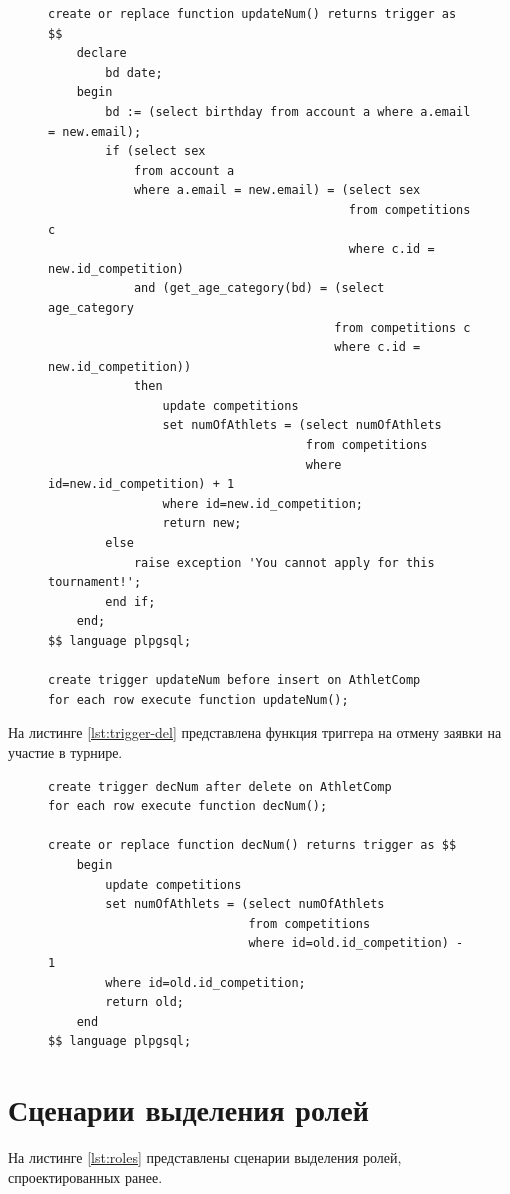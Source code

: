 \begin{figure}[H]
\begin{lstlisting}[label=lst:trigger-insert,caption=Реализация триггера BEFORE на добавление заявки ]
create or replace function updateNum() returns trigger as $$
	declare 
		bd date;
	begin
		bd := (select birthday from account a where a.email = new.email);
		if (select sex 
			from account a 
			where a.email = new.email) = (select sex 
										  from competitions c 
										  where c.id = new.id_competition) 
			and (get_age_category(bd) = (select age_category 
										from competitions c 
										where c.id = new.id_competition)) 
			then 
				update competitions
				set numOfAthlets = (select numOfAthlets 
									from competitions 
									where id=new.id_competition) + 1
				where id=new.id_competition;
				return new;
		else
			raise exception 'You cannot apply for this tournament!';
		end if;
	end;
$$ language plpgsql;

create trigger updateNum before insert on AthletComp
for each row execute function updateNum();
\end{lstlisting}
\end{figure}

На листинге \ref{lst:trigger-del} представлена функция триггера на отмену заявки на участие в турнире.

\begin{figure}[H]
	\begin{lstlisting}[label=lst:trigger-del,caption=Реализация триггера AFTER на удаление заявки ]
create trigger decNum after delete on AthletComp
for each row execute function decNum();

create or replace function decNum() returns trigger as $$
	begin
		update competitions
		set numOfAthlets = (select numOfAthlets 
							from competitions 
							where id=old.id_competition) - 1
		where id=old.id_competition;
		return old;
	end
$$ language plpgsql;
	\end{lstlisting}
\end{figure}

\section{Сценарии выделения ролей}

На листинге \ref{lst:roles} представлены сценарии выделения ролей, спроектированных ранее.


